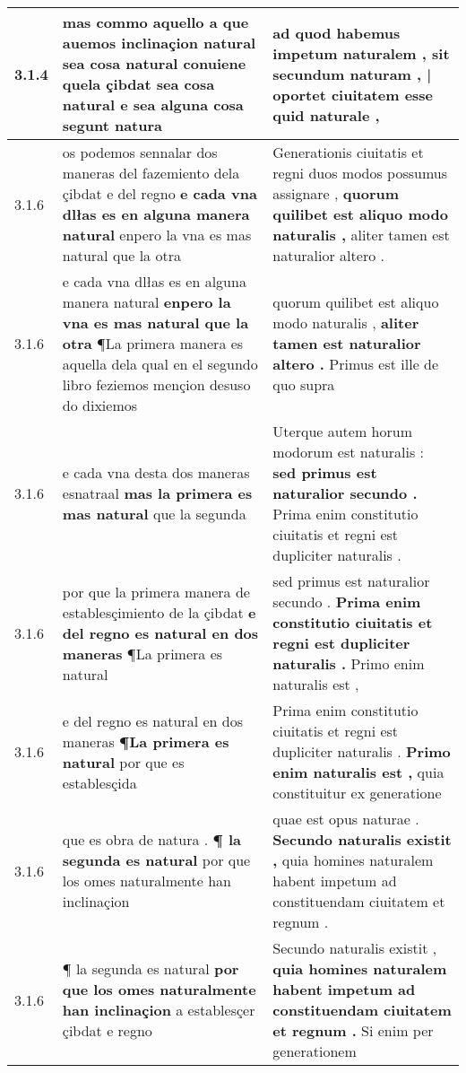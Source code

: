\begin{tabular}{|p{1cm}|p{6.5cm}|p{6.5cm}|}
3.1.4 & mas commo aquello a que auemos inclinaçion natural sea cosa natural \textbf{ conuiene quela çibdat sea cosa natural } e sea alguna cosa segunt natura & ad quod habemus impetum naturalem , \textbf{ sit secundum naturam , | oportet ciuitatem } esse quid naturale , \\\hline
3.1.6 & os podemos sennalar dos maneras del fazemiento dela çibdat e del regno \textbf{ e cada vna dlłas es en alguna manera natural } enpero la vna es mas natural que la otra & Generationis ciuitatis et regni duos modos possumus assignare , \textbf{ quorum quilibet est aliquo modo naturalis , } aliter tamen est naturalior altero . \\\hline
3.1.6 & e cada vna dlłas es en alguna manera natural \textbf{ enpero la vna es mas natural que la otra } ¶La primera manera es aquella dela qual en el segundo libro feziemos mençion desuso do dixiemos & quorum quilibet est aliquo modo naturalis , \textbf{ aliter tamen est naturalior altero . } Primus est ille de quo supra \\\hline
3.1.6 & e cada vna desta dos maneras esnatraal \textbf{ mas la primera es mas natural } que la segunda & Uterque autem horum modorum est naturalis : \textbf{ sed primus est naturalior secundo . } Prima enim constitutio ciuitatis et regni est dupliciter naturalis . \\\hline
3.1.6 & por que la primera manera de establesçimiento de la çibdat \textbf{ e del regno es natural en dos maneras } ¶La primera es natural & sed primus est naturalior secundo . \textbf{ Prima enim constitutio ciuitatis et regni est dupliciter naturalis . } Primo enim naturalis est , \\\hline
3.1.6 & e del regno es natural en dos maneras \textbf{ ¶La primera es natural } por que es establesçida & Prima enim constitutio ciuitatis et regni est dupliciter naturalis . \textbf{ Primo enim naturalis est , } quia constituitur ex generatione \\\hline
3.1.6 & que es obra de natura . \textbf{ ¶ la segunda es natural } por que los omes naturalmente han inclinaçion & quae est opus naturae . \textbf{ Secundo naturalis existit , } quia homines naturalem habent impetum ad constituendam ciuitatem et regnum . \\\hline
3.1.6 & ¶ la segunda es natural \textbf{ por que los omes naturalmente han inclinaçion } a establesçer çibdat e regno & Secundo naturalis existit , \textbf{ quia homines naturalem habent impetum ad constituendam ciuitatem et regnum . } Si enim per generationem \\\hline

\end{tabular}
